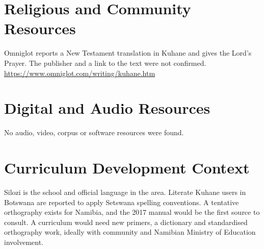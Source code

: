 \documentclass[12pt]{article}
\begin{document}
\section{Religious and Community Resources}
Omniglot reports a New Testament translation in Kuhane and gives the Lord's Prayer. The publisher and a link to the text were not confirmed. \url{https://www.omniglot.com/writing/kuhane.htm}

\section{Digital and Audio Resources}
No audio, video, corpus or software resources were found.

\section{Curriculum Development Context}
Silozi is the school and official language in the area. Literate Kuhane users in Botswana are reported to apply Setswana spelling conventions. A tentative orthography exists for Namibia, and the 2017 manual would be the first source to consult. A curriculum would need new primers, a dictionary and standardised orthography work, ideally with community and Namibian Ministry of Education involvement.
\end{document}
